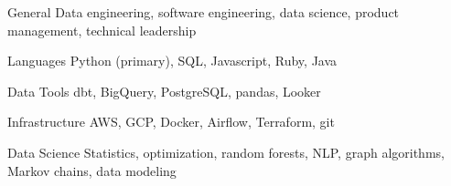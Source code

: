 

\begin{cvskills}
  \cvskill
    {General}
    {Data engineering, software engineering, data science, product management, technical leadership}

  \cvskill
    {Languages}
    {Python (primary), SQL, Javascript, Ruby, Java}

  \cvskill
    {Data Tools}
    {dbt, BigQuery, PostgreSQL, pandas, Looker}

  \cvskill
    {Infrastructure}
    {AWS, GCP, Docker, Airflow, Terraform, git}

  \cvskill
    {Data Science}
    {Statistics, optimization, random forests, NLP, graph algorithms, Markov chains, data modeling}
\end{cvskills}

